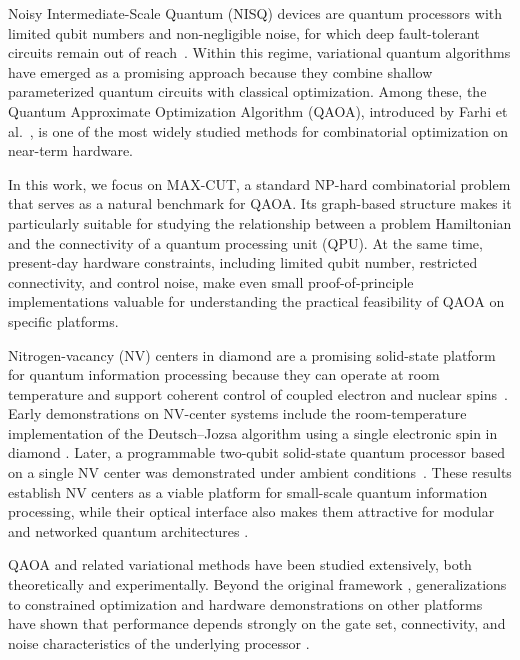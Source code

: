 \documentclass[conference]{IEEEtran}
\begin{document}
Noisy Intermediate-Scale Quantum (NISQ) devices are quantum processors with
limited qubit numbers and non-negligible noise, for which deep fault-tolerant
circuits remain out of reach~\cite{preskill2018quantum}. Within this regime,
variational quantum algorithms have emerged as a promising approach because they
combine shallow parameterized quantum circuits with classical optimization.
Among these, the Quantum Approximate Optimization Algorithm (QAOA), introduced
by Farhi et al.~\cite{farhi2014quantumapproximateoptimizationalgorithm}, is one
of the most widely studied methods for combinatorial optimization on near-term
hardware.

In this work, we focus on MAX-CUT, a standard NP-hard combinatorial problem that
serves as a natural benchmark for QAOA. Its graph-based structure makes it
particularly suitable for studying the relationship between a problem
Hamiltonian and the connectivity of a quantum processing unit (QPU). At the same
time, present-day hardware constraints, including limited qubit number,
restricted connectivity, and control noise, make even small proof-of-principle
implementations valuable for understanding the practical feasibility of QAOA on
specific platforms.

Nitrogen-vacancy (NV) centers in diamond are a promising solid-state platform
for quantum information processing because they can operate at room temperature
and support coherent control of coupled electron and nuclear
spins~\cite{balasubramanian_nanoscale_2008}. Early demonstrations on NV-center
systems include the room-temperature implementation of the Deutsch--Jozsa
algorithm using a single electronic spin in diamond
\cite{PhysRevLett.105.040504}. Later, a programmable two-qubit solid-state
quantum processor based on a single NV center was demonstrated under ambient
conditions~\cite{wu2019programmable}. These results establish NV centers as a
viable platform for small-scale quantum information processing, while their
optical interface also makes them attractive for modular and networked quantum
architectures \cite{Childress_Hanson_2013,jager2025modeling}.

QAOA and related variational methods have been studied extensively, both
theoretically and experimentally. Beyond the original framework
\cite{farhi2014quantumapproximateoptimizationalgorithm}, generalizations to
constrained optimization and hardware demonstrations on other platforms have
shown that performance depends strongly on the gate set, connectivity, and noise
characteristics of the underlying processor
\cite{hadfield2019quantum,pagano2020quantum}.
\end{document}
